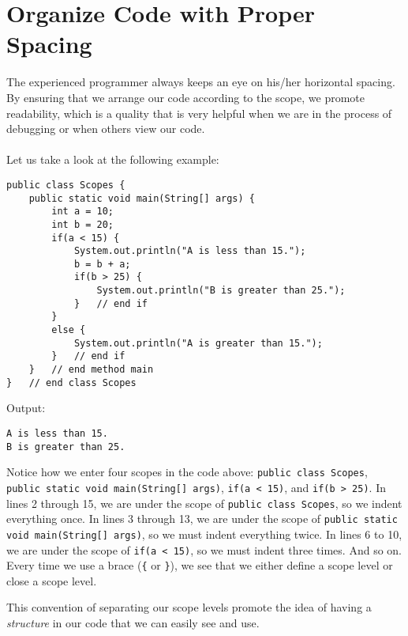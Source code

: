\documentclass[11pt,oneside]{article}
\newenvironment{articleSection}[1]
{\begin{list}{}
         {\setlength{\leftmargin}{1cm}}
         \item[]
}
{\end{list}}
\begin{document}
\section{Organize Code with Proper Spacing}
\begin{articleSection}{0.5cm}
    The experienced programmer always keeps an eye on his/her horizontal spacing. By ensuring that we arrange our code according to the scope, we promote readability, which is a quality that is very helpful when we are in the process of debugging or when others view our code.\\
    \\
    Let us take a look at the following example:
    
    \begin{lstlisting}
public class Scopes {
    public static void main(String[] args) {
        int a = 10;
        int b = 20;
        if(a < 15) {
            System.out.println("A is less than 15.");
            b = b + a;
            if(b > 25) {
                System.out.println("B is greater than 25.");
            }   // end if
        }
        else {
            System.out.println("A is greater than 15.");
        }   // end if
    }   // end method main
}   // end class Scopes
    \end{lstlisting}
    Output:
    \begin{lstlisting}
A is less than 15.
B is greater than 25.
    \end{lstlisting}

    Notice how we enter four scopes in the code above: \lstinline{public class Scopes}, \lstinline{public static void main(String[] args)}, \lstinline{if(a < 15)}, and \lstinline{if(b > 25)}. In lines 2 through 15, we are under the scope of \lstinline{public class Scopes}, so we indent everything once. In lines 3 through 13, we are under the scope of \lstinline{public static void main(String[] args)}, so we must indent everything twice. In lines 6 to 10, we are under the scope of \lstinline{if(a < 15)}, so we must indent three times. And so on.
    Every time we use a brace ({\tt\{} or {\tt\}}), we see that we either define a scope level or close a scope level.
   
    This convention of separating our scope levels promote the idea of having a \emph{structure} in our code that we can easily see and use.
    

\end{articleSection}
\end{document}
